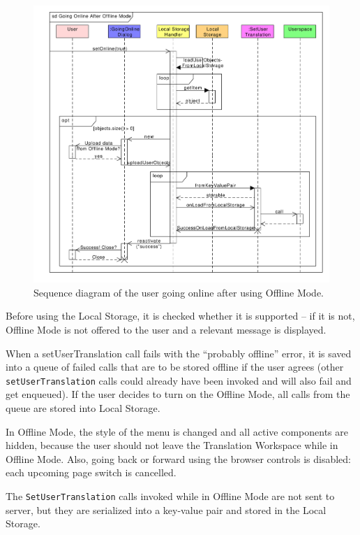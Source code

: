 \begin{figure}[h]
\begin{center}
\includegraphics[scale=0.55]{figures/offline_mode_2.pdf}
\end{center}
\caption{Sequence diagram of the user going online after using Offline Mode.}\label{gui:sd:offline_mode_2}
\end{figure}

Before using the Local Storage, it is checked whether it is supported -- if it is not, Offline Mode is not offered to the user and a relevant message is displayed.

When a setUserTranslation call fails with the ``probably offline'' error, it is saved into a queue of failed calls that are to be stored offline if the user agrees (other {\tt setUserTranslation} calls could already have been invoked and will also fail and get enqueued). If the user decides to turn on the Offline Mode, all calls from the queue are stored into Local Storage.

In Offline Mode, the style of the menu is changed and all active components are hidden, because the user should not leave the Translation Workspace while in Offline Mode. Also, going back or forward using the browser controls is disabled: each upcoming page switch is cancelled.

The {\tt SetUserTranslation} calls invoked while in Offline Mode are not sent to server, but they are serialized into a key-value pair and stored in the Local Storage.

